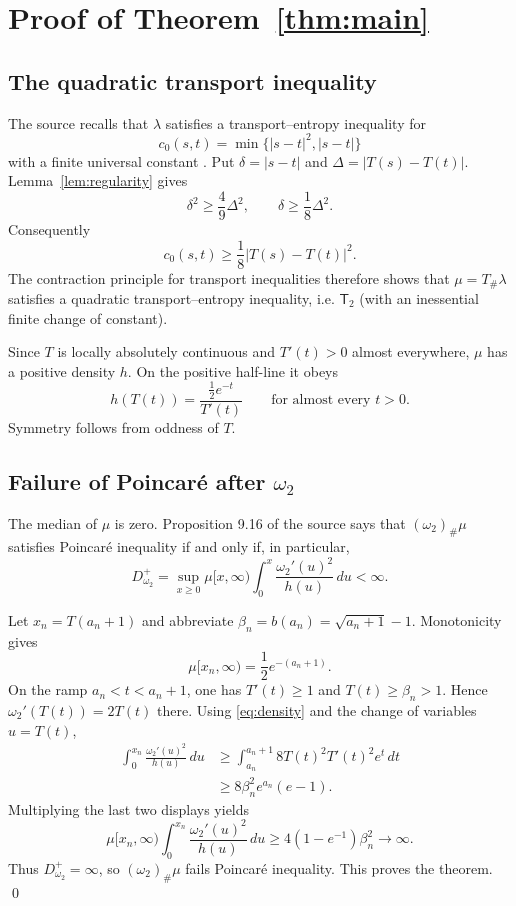 \documentclass[11pt]{article}
\newcommand{\Ttwo}{\mathsf{T}_2}
\newcommand{\law}{\lambda}
\begin{document}
\section{Proof of Theorem~\ref{thm:main}}

\subsection*{The quadratic transport inequality}

The source recalls that $\law$ satisfies a transport--entropy inequality for
\[
 c_0(s,t)=\min\{|s-t|^2,|s-t|\}
\]
with a finite universal constant \cite[Section 9.3]{GL}.  Put
$\delta=|s-t|$ and $\Delta=|T(s)-T(t)|$.  Lemma~\ref{lem:regularity} gives
\[
 \delta^2\geq\frac49\Delta^2,
 \qquad
 \delta\geq\frac18\Delta^2.
\]
Consequently
\[
 c_0(s,t)\geq\frac18|T(s)-T(t)|^2.
\]
The contraction principle for transport inequalities therefore shows that
$\mu=T_\#\law$ satisfies a quadratic transport--entropy inequality, i.e.
$\Ttwo$ (with an inessential finite change of constant).

Since $T$ is locally absolutely continuous and $T'(t)>0$ almost everywhere,
$\mu$ has a positive density $h$.  On the positive half-line it obeys
\begin{equation}\label{eq:density}
 h(T(t))=\frac{\frac12e^{-t}}{T'(t)}
 \qquad\text{for almost every }t>0.
\end{equation}
Symmetry follows from oddness of $T$.

\subsection*{Failure of Poincar\'e after $\omega_2$}

The median of $\mu$ is zero.  Proposition 9.16 of the source says that
$(\omega_2)_\#\mu$ satisfies Poincar\'e inequality if and only if, in
particular,
\begin{equation}\label{eq:muck}
 D^+_{\omega_2}
 =\sup_{x\geq0}\mu[x,\infty)
   \int_0^x\frac{\omega_2'(u)^2}{h(u)}\,du
 <\infty.
\end{equation}

Let $x_n=T(a_n+1)$ and abbreviate
$\beta_n=b(a_n)=\sqrt{a_n+1}-1$.  Monotonicity gives
\[
 \mu[x_n,\infty)=\frac12e^{-(a_n+1)}.
\]
On the ramp $a_n<t<a_n+1$, one has $T'(t)\geq1$ and
$T(t)\geq\beta_n>1$.  Hence $\omega_2'(T(t))=2T(t)$ there.  Using
\eqref{eq:density} and the change of variables $u=T(t)$,
\begin{align*}
 \int_0^{x_n}\frac{\omega_2'(u)^2}{h(u)}\,du
 &\geq
 \int_{a_n}^{a_n+1}8T(t)^2T'(t)^2e^t\,dt\\
 &\geq8\beta_n^2 e^{a_n}(e-1).
\end{align*}
Multiplying the last two displays yields
\[
 \mu[x_n,\infty)
 \int_0^{x_n}\frac{\omega_2'(u)^2}{h(u)}\,du
 \geq4(1-e^{-1})\beta_n^2\longrightarrow\infty.
\]
Thus $D^+_{\omega_2}=\infty$, so $(\omega_2)_\#\mu$ fails
Poincar\'e inequality.  This proves the theorem. \qed
\end{document}
